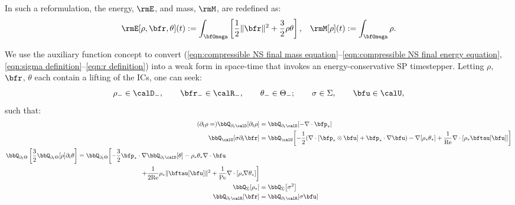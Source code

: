     In such a reformulation, the energy, $\rmE$, and mass, $\rmM$, are redefined as:
    \begin{align}
        \rmE[\rho, \bfr, \theta](t)  :=  \int_{\bfOmega}\left[\frac{1}{2}\|\bfr\|^{2} + \frac{3}{2}\rho\theta\right],  &&
                      \rmM[\rho](t)  :=  \int_{\bfOmega}\rho.
    \end{align}

    \line

    We use the auxiliary function concept to convert (\ref{eqn:compressible NS final mass equation}--\ref{eqn:compressible NS final energy equation}, \ref{eqn:sigma definition}--\ref{eqn:r definition}) into a weak form in space-time that invokes an energy-conservative SP timestepper. Letting $\rho$, $\bfr$, $\theta$ each contain a lifting of the ICs, one can seek:
    \begin{equation}
        \rho_{-}    \in  \calD_{-},   \qquad
        \bfr_{-}    \in  \calR_{-},   \qquad
        \theta_{-}  \in  \Theta_{-};  \qquad
        \sigma      \in  \Sigma,      \qquad
        \bfu        \in  \calU,
    \end{equation}
    such that:
    \begin{align}
            (\partial_{t}\rho
            =)
            \bbQ_{\partial_{t}\calD}[\partial_{t}\rho]
            &=
            \bbQ_{\partial_{t}\calD}[- \nabla\cdot\bfp_{*}]  \label{eqn:compressible NS weak mass equation}  \\
            \bbQ_{\calU}[\sigma\partial_{t}\bfr]
            &=
            \bbQ_{\calU}\!\left[- \frac{1}{2}(\nabla\cdot\left[\bfp_{*}\otimes\bfu\right] + \bfp_{*}\cdot\nabla\bfu)
            - \nabla[\rho_{*}\theta_{*}]
            + \frac{1}{\rmRe}\nabla\cdot[\rho_{*}\bftau[\bfu]]\right]  \\
        \begin{split}
            \bbQ_{\partial_{t}\Theta}\left[\frac{3}{2}\bbQ_{\partial_{t}\Theta}[\rho]\partial_{t}\theta\right]
            &=
            \bbQ_{\partial_{t}\Theta}\!\left[- \frac{3}{2}\bfp_{*}\cdot\nabla\bbQ_{\partial_{t}\calD}[\theta]
            - \rho_{*}\theta_{*}\nabla\cdot\bfu\right.  \\
            &\qquad\qquad\qquad\qquad\qquad\left.+ \frac{1}{2\rmRe}\rho_{*}\|\bftau[\bfu]\|^{2}
            + \frac{1}{\rmPe}\nabla\cdot[\rho_{*}\!\nabla\theta_{*}]\right]
        \end{split}  \label{eqn:compressible NS weak energy equation}  \\
            \bbQ_{\Sigma}[\rho_{*}]
            &=
            \bbQ_{\Sigma}\!\left[\sigma^{2}\right]  \\
            \bbQ_{\partial_{t}\calR}[\bfr]
            &=
            \bbQ_{\partial_{t}\calR}[\sigma\bfu]
    \end{align}
